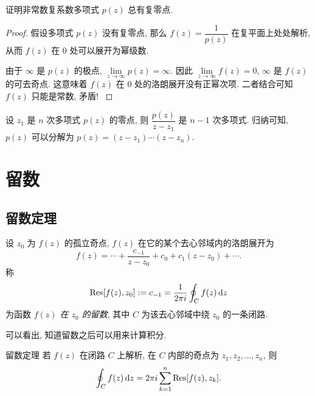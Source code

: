 \begin{example}
	证明非常数复系数多项式 $p(z)$ 总有复零点.
\end{example}

\begin{proof}
	假设多项式 $p(z)$ 没有复零点, 那么 $f(z)=\dfrac1{p(z)}$ 在复平面上处处解析, 
{%
	从而 $f(z)$ 在 $0$ 处可以展开为幂级数.
}

{%
	由于 $\infty$ 是 $p(z)$ 的极点, $\lim\limits_{z\to\infty}p(z)=\infty$.
}%
{%
	因此 $\lim\limits_{z\to\infty}f(z)=0$, $\infty$ 是 $f(z)$ 的可去奇点.
}%
{%
	这意味着 $f(z)$ 在 $0$ 处的洛朗展开没有正幂次项.
}%
{%
	二者结合可知 $f(z)$ 只能是常数, 矛盾!\qedhere
}
\end{proof}

设 $z_1$ 是 $n$ 次多项式 $p(z)$ 的零点, 则 $\dfrac{p(z)}{z-z_1}$ 是 $n-1$ 次多项式.
归纳可知, $p(z)$ 可以分解为 $p(z)=(z-z_1)\cdots(z-z_n)$.

\section{留数}

\subsection{留数定理}

\begin{definition}
	设 $z_0$ 为 $f(z)$ 的孤立奇点, $f(z)$ 在它的某个去心邻域内的洛朗展开为
		\[f(z)=\cdots+\frac{c_{-1}}{z-z_0}+c_0+c_1(z-z_0)+\cdots.\]
	称
		\[{\mathrm{Res}}[f(z),z_0]:=c_{-1}=\frac1{2\pi i}\oint_Cf(z)\,\mathrm{d} z\]
	为函数 \emph{$f(z)$ 在 $z_0$ 的留数}, 其中 $C$ 为该去心邻域中绕 $z_0$ 的一条闭路.
\end{definition}

可以看出, 知道留数之后可以用来计算积分.

\begin{block}{留数定理}
	若 $f(z)$ 在闭路 $C$ 上解析, 在 $C$ 内部的奇点为 $z_1,z_2,\dots,z_n$, 则
	\[\oint_Cf(z)\,\mathrm{d} z=2\pi i\sum_{k=1}^n{\mathrm{Res}}[f(z),z_k].\]
\end{block}

